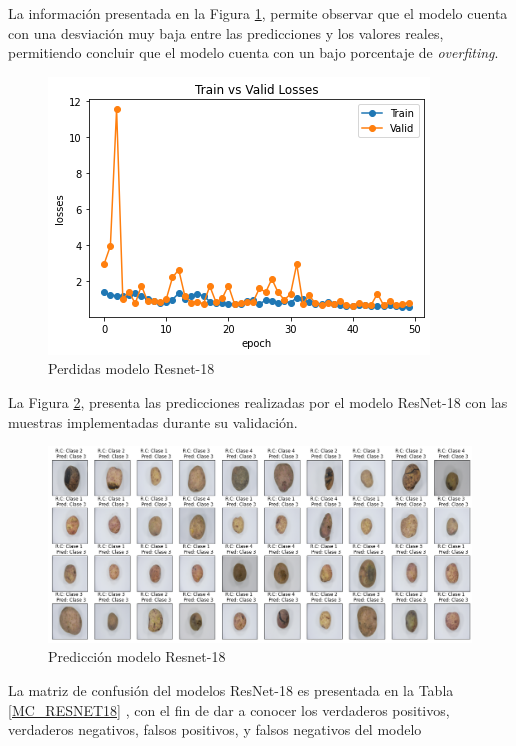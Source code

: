 La información presentada en la Figura \ref{fig:perdda_RESNET18}, permite observar que el modelo cuenta con una desviación muy baja entre las predicciones y los valores reales, permitiendo concluir que el modelo cuenta con un bajo porcentaje de \textit{overfiting}. 

\begin{figure}[ht]
	\centering
	\includegraphics[scale=0.55]{Figs/110.png}
	\caption{Perdidas modelo Resnet-18}
	\label{fig:perdda_RESNET18}
\end{figure}

\newpage
La Figura \ref{fig:pre_RESNET18}, presenta las predicciones realizadas por el modelo ResNet-18 con las muestras implementadas durante su validación.

\begin{figure}[ht]
	\centering
	\includegraphics[scale=0.4]{Figs/111.png}
	\caption{Predicción modelo Resnet-18}
	\label{fig:pre_RESNET18}
\end{figure}

La matriz de confusión del modelos ResNet-18 es presentada en la Tabla \ref*{MC_RESNET18} , con el fin de dar a conocer los verdaderos positivos, verdaderos negativos, falsos positivos, y falsos negativos del modelo


